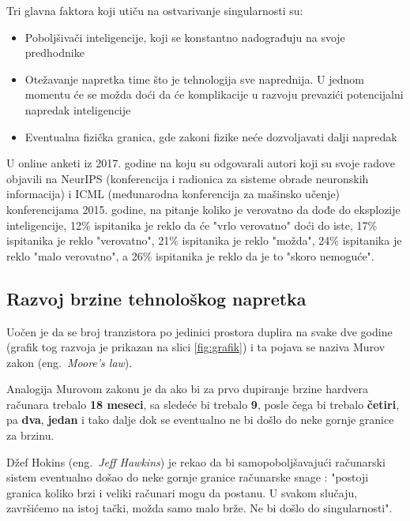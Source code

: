 \documentclass[a4paper]{article}
\begin{document}
Tri glavna faktora koji utiču na ostvarivanje singularnosti su\cite{ref9}:
\begin{itemize}
\item Poboljšivači inteligencije, koji se konstantno nadograđuju na svoje predhodnike 
\item Otežavanje napretka time što je tehnologija sve naprednija. U jednom momentu će se možda doći da će komplikacije u razvoju prevazići potencijalni napredak inteligencije
\item Eventualna fizička granica, gde zakoni fizike neće dozvoljavati dalji napredak  
\end{itemize} 
U online anketi iz 2017. godine na koju su odgovarali autori koji su svoje radove objavili na NeurIPS (konferencija i radionica za sisteme obrade neuronskih informacija) i ICML (međunarodna konferencija za mašinsko učenje) konferencijama 2015. godine, na pitanje koliko je verovatno da dođe do eksplozije inteligencije, 12\% ispitanika je reklo da će "vrlo verovatno" doći do iste, 17\% ispitanika je reklo "verovatno", 21\% ispitanika je reklo "možda", 24\% ispitanika je reklo "malo verovatno", a 26\% ispitanika je reklo da je to "skoro nemoguće"\cite{ref10}.

\subsection{Razvoj brzine tehnološkog napretka}

Uočen je da se broj tranzistora po jedinici prostora duplira na svake dve godine (grafik tog razvoja je prikazan na slici \ref{fig:grafik}) i ta pojava se naziva Murov zakon (eng.~{\em Moore's law}). 

Analogija Murovom zakonu je da ako bi za prvo dupiranje brzine hardvera računara trebalo \textbf{18 meseci}, sa sledeće bi trebalo \textbf{9}, posle čega bi trebalo \textbf{četiri}, pa \textbf{dva}, \textbf{jedan} i tako dalje dok se eventualno ne bi došlo do neke gornje granice za brzinu.

Džef Hokins (eng.~{\em Jeff Hawkins}) je rekao da bi samopoboljšavajući računarski sistem eventualno došao do neke gornje granice računarske snage : "postoji granica koliko brzi i veliki računari mogu da postanu. U svakom slučaju, završićemo na istoj tački, možda samo malo brže. Ne bi došlo do singularnosti"\cite{ref11}.
\end{document}
